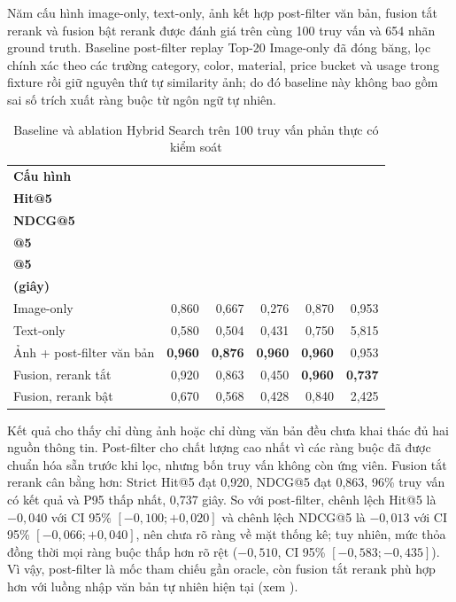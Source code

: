 Năm cấu hình image-only, text-only, ảnh kết hợp post-filter văn bản, fusion tắt rerank và fusion bật rerank được đánh giá trên cùng 100 truy vấn và 654 nhãn ground truth. Baseline post-filter replay Top-20 Image-only đã đóng băng, lọc chính xác theo các trường category, color, material, price bucket và usage trong fixture rồi giữ nguyên thứ tự similarity ảnh; do đó baseline này không bao gồm sai số trích xuất ràng buộc từ ngôn ngữ tự nhiên.
\begin{table}[H]
\centering
\caption{Baseline và ablation Hybrid Search trên 100 truy vấn phản thực có kiểm soát}
\label{tab:hybrid-results}
\begin{tabularx}{\linewidth}{|X|r|r|r|r|r|}
\hline
\textbf{Cấu hình} & \makecell{\textbf{Strict}\\\textbf{Hit@5}} & \makecell{\textbf{Graded}\\\textbf{NDCG@5}} & \makecell{\textbf{Thỏa RB}\\\textbf{@5}} & \makecell{\textbf{Query đạt}\\\textbf{@5}} & \makecell{\textbf{P95}\\\textbf{(giây)}} \\ \hline
Image-only & 0,860 & 0,667 & 0,276 & 0,870 & 0,953 \\ \hline
Text-only & 0,580 & 0,504 & 0,431 & 0,750 & 5,815 \\ \hline
Ảnh + post-filter văn bản & \textbf{0,960} & \textbf{0,876} & \textbf{0,960} & \textbf{0,960} & 0,953 \\ \hline
Fusion, rerank tắt & 0,920 & 0,863 & 0,450 & \textbf{0,960} & \textbf{0,737} \\ \hline
Fusion, rerank bật & 0,670 & 0,568 & 0,428 & 0,840 & 2,425 \\ \hline
\end{tabularx}
\end{table}

Kết quả cho thấy chỉ dùng ảnh hoặc chỉ dùng văn bản đều chưa khai thác đủ hai nguồn thông tin. Post-filter cho chất lượng cao nhất vì các ràng buộc đã được chuẩn hóa sẵn trước khi lọc, nhưng bốn truy vấn không còn ứng viên. Fusion tắt rerank cân bằng hơn: Strict Hit@5 đạt 0,920, NDCG@5 đạt 0,863, 96\% truy vấn có kết quả và P95 thấp nhất, 0,737 giây. So với post-filter, chênh lệch Hit@5 là $-0{,}040$ với CI 95\% $[-0{,}100; +0{,}020]$ và chênh lệch NDCG@5 là $-0{,}013$ với CI 95\% $[-0{,}066; +0{,}040]$, nên chưa rõ ràng về mặt thống kê; tuy nhiên, mức thỏa đồng thời mọi ràng buộc thấp hơn rõ rệt ($-0{,}510$, CI 95\% $[-0{,}583; -0{,}435]$). Vì vậy, post-filter là mốc tham chiếu gần oracle, còn fusion tắt rerank phù hợp hơn với luồng nhập văn bản tự nhiên hiện tại (xem ).

